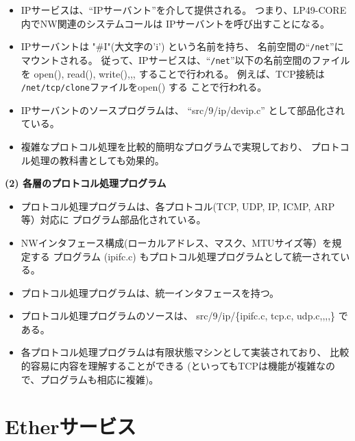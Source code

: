 \begin{itemize}
\item  IPサービスは、``IPサーバント''を介して提供される。
       つまり、LP49-CORE内でNW関連のシステムコールは 
       IPサーバントを呼び出すことになる。

\item  IPサーバントは "\#I"(大文字の'i') という名前を持ち、
       名前空間の``\verb|/net|''にマウントされる。
       従って、IPサービスは、``\verb|/net|''以下の名前空間のファイルを
       open(), read(), write(),,,   することで行われる。
       例えば、TCP接続は \verb|/net/tcp/clone|ファイルをopen() する
       ことで行われる。

\item  IPサーバントのソースプログラムは、 ``src/9/ip/devip.c'' として部品化されている。

\item    複雑なプロトコル処理を比較的簡明なプログラムで実現しており、
    プロトコル処理の教科書としても効果的。
\end{itemize}


{\bf \flushleft(2) 各層のプロトコル処理プログラム}

\begin{itemize}
\item  プロトコル処理プログラムは、各プロトコル(TCP, UDP, IP, ICMP, ARP 等）対応に
       プログラム部品化されている。

\item  NWインタフェース構成(ローカルアドレス、マスク、MTUサイズ等）を規定する
       プログラム (ipifc.c) もプロトコル処理プログラムとして統一されている。

\item  プロトコル処理プログラムは、統一インタフェースを持つ。

\item  プロトコル処理プログラムのソースは、 src/9/ip/\{ipifc.c, tcp.c, udp.c,,,,\} 
       である。

\item  各プロトコル処理プログラムは有限状態マシンとして実装されており、
       比較的容易に内容を理解することができる
       (といってもTCPは機能が複雑なので、プログラムも相応に複雑)。

\end{itemize}
    

\section{Etherサービス}

